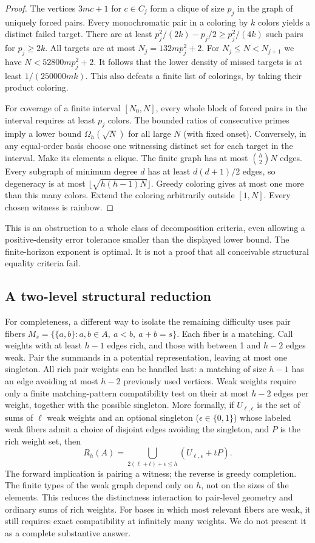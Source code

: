 \documentclass[11pt]{article}
\theoremstyle{remark}\newtheorem{remark}[theorem]{Remark}
\begin{document}
\begin{proof}
The vertices $3mc+1$ for $c\in C_j$ form a clique of size $p_j$ in the graph of uniquely forced pairs. Every monochromatic pair in a coloring by $k$ colors yields a distinct failed target. There are at least $p_j^2/(2k)-p_j/2\ge p_j^2/(4k)$ such pairs for $p_j\ge2k$. All targets are at most $N_j=132mp_j^2+2$. For $N_j\le N<N_{j+1}$ we have $N<52800mp_j^2+2$. It follows that the lower density of missed targets is at least $1/(250000mk)$. This also defeats a finite list of colorings, by taking their product coloring.

For coverage of a finite interval $[N_0,N]$, every whole block of forced pairs in the interval requires at least $p_j$ colors. The bounded ratios of consecutive primes imply a lower bound $\Omega_h(\sqrt N)$ for all large $N$ (with fixed onset). Conversely, in any equal-order basis choose one witnessing distinct set for each target in the interval. Make its elements a clique. The finite graph has at most $\binom h2 N$ edges. Every subgraph of minimum degree $d$ has at least $d(d+1)/2$ edges, so degeneracy is at most $\lfloor\sqrt{h(h-1)N}\rfloor$. Greedy coloring gives at most one more than this many colors. Extend the coloring arbitrarily outside $[1,N]$. Every chosen witness is rainbow.
\end{proof}
This is an obstruction to a whole class of decomposition criteria, even allowing a positive-density error tolerance smaller than the displayed lower bound. The finite-horizon exponent is optimal. It is not a proof that all conceivable structural equality criteria fail.

\subsection{A two-level structural reduction}
For completeness, a different way to isolate the remaining difficulty uses pair fibers $M_s=\{\{a,b\}:a,b\in A,\ a<b,\ a+b=s\}$. Each fiber is a matching. Call weights with at least $h-1$ edges rich, and those with between 1 and $h-2$ edges weak. Pair the summands in a potential representation, leaving at most one singleton. All rich pair weights can be handled last: a matching of size $h-1$ has an edge avoiding at most $h-2$ previously used vertices. Weak weights require only a finite matching-pattern compatibility test on their at most $h-2$ edges per weight, together with the possible singleton. More formally, if $U_{\ell,\epsilon}$ is the set of sums of $\ell$ weak weights and an optional singleton ($\epsilon\in\{0,1\}$) whose labeled weak fibers admit a choice of disjoint edges avoiding the singleton, and $P$ is the rich weight set, then
\[
R_h(A)=\bigcup_{2(\ell+t)+\epsilon\le h}(U_{\ell,\epsilon}+tP).
\]
The forward implication is pairing a witness; the reverse is greedy completion. The finite types of the weak graph depend only on $h$, not on the sizes of the elements. This reduces the distinctness interaction to pair-level geometry and ordinary sums of rich weights. For bases in which most relevant fibers are weak, it still requires exact compatibility at infinitely many weights. We do not present it as a complete substantive answer.
\end{document}
